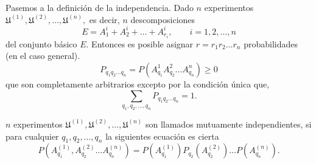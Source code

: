 Pasemos a la definición de la independencia. Dado $n$ experimentos $\mathfrak{U}^{(1)},\mathfrak{U}^{(2)},\ldots,\mathfrak{U}^{(n)},$ es decir, $n$ descomposiciones 
$$E=A_1^{i} +A_2^{i} + \ldots + A_{r_i}^{i}, \qquad i=1,2,\ldots,n$$
del conjunto básico $E$. Entonces es posible asignar $r=r_1 r_2 \ldots r_n$ probabilidades (en el caso general).
$$P_{q_1 q_2 \ldots q_n} = P(A_{q_1}^{1} A_{q_2}^{2} \ldots A_{q_n}^{n}) \geq 0$$
que son completamente arbitrarios excepto por la condición única que,
\begin{equation}
    \sum_{q_1, q_2,\ldots,q_n} P_{q_1 q_2 \ldots q_n} = 1.
\end{equation}

\begin{tcolorbox}[colframe=white]
    \begin{def.} $n$ experimentos $\mathfrak{U}^{(1)}, \mathfrak{U}^{(2)},\ldots,\mathfrak{U}^{(n)}$ son llamados mutuamente independientes, si para cualquier $q_1,q_2,\ldots,q_n$ la siguientes ecuación es cierta
	\begin{equation}
	    P\left(A_{q_1}^{(1)},A_{q_2}^{(2)}\ldots A_{q_n}^{(n)}\right) = P\left(A_{q_1}^{(1)}\right)P_{q_2}\left(A_{q_2}^{(2)}\right)\ldots P\left(A_{q_n}^{(n)}\right). 
	\end{equation}
    \end{def.}
\end{tcolorbox}
